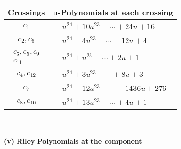 \documentclass[1p]{elsarticle_modified}
\theoremstyle{definition}
\begin{document}
\begin{tabular}{m{50pt}|m{274pt}}
Crossings & \hspace{64pt}u-Polynomials at each crossing \\
\hline $$\begin{aligned}c_{1}\end{aligned}$$&$\begin{aligned}
&u^{24}+10 u^{23}+\cdots+24 u+16
\end{aligned}$\\
\hline $$\begin{aligned}c_{2},c_{6}\end{aligned}$$&$\begin{aligned}
&u^{24}-4 u^{23}+\cdots-12 u+4
\end{aligned}$\\
\hline $$\begin{aligned}c_{3},c_{5},c_{9}\\c_{11}\end{aligned}$$&$\begin{aligned}
&u^{24}+u^{23}+\cdots+2 u+1
\end{aligned}$\\
\hline $$\begin{aligned}c_{4},c_{12}\end{aligned}$$&$\begin{aligned}
&u^{24}+3 u^{23}+\cdots+8 u+3
\end{aligned}$\\
\hline $$\begin{aligned}c_{7}\end{aligned}$$&$\begin{aligned}
&u^{24}-12 u^{23}+\cdots-1436 u+276
\end{aligned}$\\
\hline $$\begin{aligned}c_{8},c_{10}\end{aligned}$$&$\begin{aligned}
&u^{24}+13 u^{23}+\cdots+4 u+1
\end{aligned}$\\
\hline
\end{tabular}\\~\\
\newpage\renewcommand{\arraystretch}{1}
\flushleft \textbf{(v) Riley Polynomials at the component}\newline \\
\end{document}
